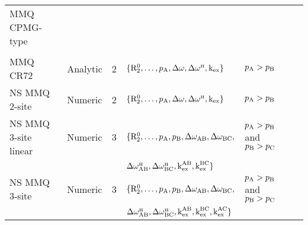 \begin{center}
\begin{small}
\begin{longtable}{llllll}
\clearpage
MMQ CPMG-type \\
\cline{1-1}
\\[-5pt]
MMQ CR72                 & Analytic & 2     & $\{\Rtwozero, \dots, \pA, \dw, \dwH, \kex\}$        & $\pA > \pB$                       & \citet{Korzhnev04a} \\
NS MMQ 2-site            & Numeric  & 2     & $\{\Rtwozero, \dots, \pA, \dw, \dwH, \kex\}$        & $\pA > \pB$                       & \citet{Korzhnev05b} \\
NS MMQ 3-site linear     & Numeric  & 3     & $\{\Rtwozero, \dots, \pA, \pB, \dwAB, \dwBC,$       & $\pA > \pB$ and $\pB > \pC$       & \citet{Korzhnev05b} \\
                         &          &       & $\dwHAB, \dwHBC, \kexAB, \kexBC\}$ \\
NS MMQ 3-site            & Numeric  & 3     & $\{\Rtwozero, \dots, \pA, \pB, \dwAB, \dwBC,$       & $\pA > \pB$ and $\pB > \pC$       & \citet{Korzhnev05b} \\
                         &          &       & $\dwHAB, \dwHBC, \kexAB, \kexBC, \kexAC\}$ \\


\end{longtable}
\end{small}
\end{center}

